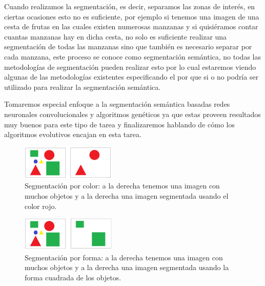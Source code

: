 \documentclass[conference,compsoc]{IEEEtran}
\begin{document}
Cuando realizamos la segmentación, es decir, separamos las zonas de interés, en ciertas ocasiones esto no es suficiente, por ejemplo si tenemos una imagen de una cesta de frutas en las cuales existen numerosas manzanas y si quisiéramos contar cuantas manzanas hay en dicha cesta, no solo es suficiente realizar una segmentación de todas las manzanas sino que también es necesario separar por cada manzana, este proceso se conoce como segmentación semántica\cite{segsem}, no todas las metodologías de segmentación pueden realizar esto por lo cual estaremos viendo algunas de las metodologías existentes especificando el por que si o no podría ser utilizado para realizar la segmentación semántica.

Tomaremos especial enfoque a la segmentación semántica basadas redes neuronales convolucionales y algoritmos genéticos ya que estas proveen resultados muy buenos para este tipo de tarea\cite{segconv} y finalizaremos hablando de cómo los algoritmos evolutivos encajan en esta tarea.


\begin{figure}[b]
\centering
\includegraphics[width=0.4\textwidth]{setmentacionporcolor.png}
\caption{\label{fig:setmentacionporcolor}Segmentación por color: a la derecha tenemos una imagen con muchos objetos y a la derecha una imagen segmentada usando el color rojo.}
\end{figure}

\begin{figure}[h]
\centering
\includegraphics[width=0.4\textwidth]{setmentacionporforma.jpg}
\caption{\label{fig:setmentacionporforma}Segmentación por forma: a la derecha tenemos una imagen con muchos objetos y a la derecha una imagen segmentada usando la forma cuadrada de los objetos.}
\end{figure}

\end{document}

